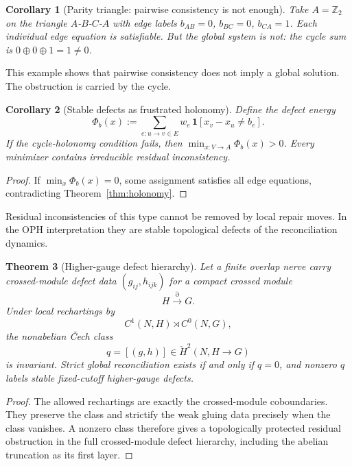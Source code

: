 \documentclass[11pt]{article}
\newtheorem{theorem}{Theorem}[section]
\newtheorem{corollary}[theorem]{Corollary}
\theoremstyle{remark}
\theoremstyle{plain}
\begin{document}
\begin{corollary}[Parity triangle: pairwise consistency is not enough]\label{cor:triangle}
Take $A=\mathbb{Z}_2$ on the triangle $A$-$B$-$C$-$A$ with edge labels $b_{AB}=0$, $b_{BC}=0$, $b_{CA}=1$. Each individual edge equation is satisfiable. But the global system is not: the cycle sum is $0\oplus 0\oplus 1 = 1\neq 0$.
\end{corollary}

This example shows that pairwise consistency does not imply a global solution. The obstruction is
carried by the cycle.

\begin{corollary}[Stable defects as frustrated holonomy]\label{cor:defects}
Define the defect energy
\[
\Phi_b(x) := \sum_{e:u\to v\in E} w_e\,\mathbf{1}\!\left[x_v - x_u \neq b_e\right].
\]
If the cycle-holonomy condition fails, then $\min_{x:V\to A}\Phi_b(x)>0$. Every minimizer contains irreducible residual inconsistency.
\end{corollary}

\begin{proof}
If $\min_x\Phi_b(x)=0$, some assignment satisfies all edge equations, contradicting Theorem~\ref{thm:holonomy}.
\end{proof}

Residual inconsistencies of this type cannot be removed by local repair moves. In the OPH
interpretation they are stable topological defects of the reconciliation dynamics.

\begin{theorem}[Higher-gauge defect hierarchy]\label{thm:higherdefects}
Let a finite overlap nerve carry crossed-module defect data \((g_{ij},h_{ijk})\) for a compact crossed module
\[
H\xrightarrow{\partial} G.
\]
Under local rechartings by
\[
C^1(N,H)\rtimes C^0(N,G),
\]
the nonabelian \v{C}ech class
\[
q=[(g,h)]\in \check H^2(N,H\to G)
\]
is invariant. Strict global reconciliation exists if and only if \(q=0\), and nonzero \(q\) labels stable fixed-cutoff higher-gauge defects.
\end{theorem}

\begin{proof}
The allowed rechartings are exactly the crossed-module coboundaries. They preserve the class and
strictify the weak gluing data precisely when the class vanishes. A nonzero class therefore gives
a topologically protected residual obstruction in the full crossed-module defect hierarchy,
including the abelian truncation as its first layer.
\end{proof}
\end{document}
